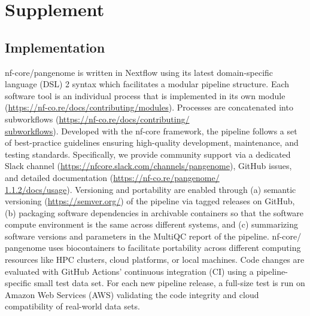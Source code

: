 \documentclass{bioinfo}
\theoremstyle{definition}
\newcommand{\beginsupplement}{%
	\setcounter{table}{0}
	\renewcommand{\thetable}{S\arabic{table}}%
	\setcounter{figure}{0}
	\renewcommand{\thefigure}{S\arabic{figure}}%
}
\begin{document}
	
	
	
	
	\clearpage
	\setcounter{page}{1}
	
	\beginsupplement
	
	\section{Supplement}
	
	\subsection{Implementation}
	\label{implementation}
	
	nf-core/pangenome is written in Nextflow using its latest domain-specific language (DSL) 2 syntax which facilitates a modular pipeline structure. 
	Each software tool is an individual process that is implemented in its own module (\href{https://nf-co.re/docs/contributing/modules}{https://nf-co.re/docs/contributing/modules}). 
	Processes are concatenated into subworkflows (\href{https://nf-co.re/docs/contributing/subworkflows}{https://nf-co.re/docs/contributing/\\subworkflows}). 
	Developed with the nf-core framework, the pipeline follows a set of best-practice guidelines ensuring high-quality development, maintenance, and testing standards. Specifically, we provide community support via a dedicated Slack channel (\href{https://nfcore.slack.com/channels/pangenome}{https://nfcore.slack.com/channels/pangenome}), GitHub issues, and detailed documentation (\href{https://nf-co.re/pangenome/1.1.2/docs/usage}{https://nf-co.re/pangenome/\\1.1.2/docs/usage}).
	Versioning and portability are enabled through (a) semantic versioning (\href{https://semver.org/}{https://semver.org/}) of the pipeline via tagged releases on GitHub, (b) packaging software dependencies in archivable containers so that the software compute environment is the same across different systems, and (c) summarizing software versions and parameters in the MultiQC report of the pipeline. 
	nf-core/ pangenome uses biocontainers to facilitate portability across different computing resources like HPC clusters, cloud platforms, or local machines. 
	Code changes are evaluated with GitHub Actions’ continuous integration (CI) using a pipeline-specific small test data set. 
	For each new pipeline release, a full-size test is run on Amazon Web Services (AWS) validating the code integrity and cloud compatibility of real-world data sets.
\end{document}

